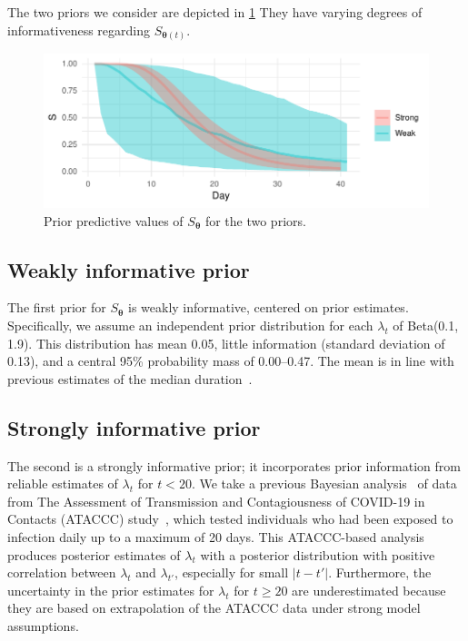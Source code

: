 \documentclass[referee,useAMS,usenatbib]{biom}
\renewcommand{\vec}[1]{\bm{#1}}
\begin{document}
The two priors we consider are depicted in \cref{fig:priors}
They have varying degrees of informativeness regarding $S_{\vec{\theta}(t)}$.
\begin{figure}
  \includegraphics{figures/output/prior_predictive_survival}
  \caption{%
    Prior predictive values of $S_{\vec{\theta}}$ for the two priors.
  }
  \label{fig:priors}
\end{figure}

\subsection{Weakly informative prior}

The first prior for $S_{\vec{\theta}}$ is weakly informative, centered on prior estimates.
Specifically, we assume an independent prior distribution for each $\lambda_t$ of Beta(0.1, 1.9).
This distribution has mean 0.05, little information (standard deviation of 0.13), and a central 95\% probability mass of 0.00--0.47.
The mean is in line with previous estimates of the median duration~\citep{cevikShedding}.

\subsection{Strongly informative prior} \label{sec:ataccc-prior}

The second is a strongly informative prior; it incorporates prior information from reliable estimates of $\lambda_t$ for $t < 20$.
We take a previous Bayesian analysis~\citep{blakeThesis} of data from The Assessment of Transmission and Contagiousness of COVID-19 in Contacts (ATACCC) study~\citep{hakkiOnset}, which tested individuals who had been exposed to infection daily up to a maximum of 20 days.
This ATACCC-based analysis produces posterior estimates of $\lambda_t$ with a posterior distribution with positive correlation between $\lambda_t$ and $\lambda_{t'}$, especially for small $|t-t'|$.
Furthermore, the uncertainty in the prior estimates for $\lambda_t$ for $t\geq20$ are underestimated because they are based on extrapolation of the ATACCC data under strong model assumptions.
\end{document}
